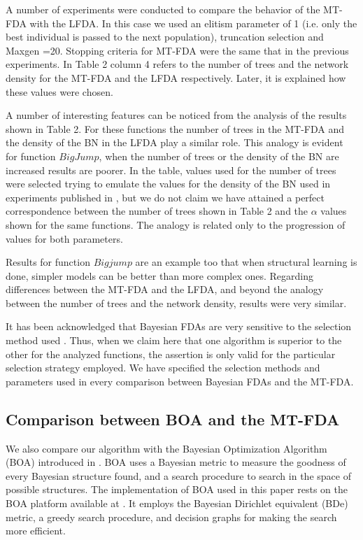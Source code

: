 \documentclass[10pt,thmsa]{article}
\begin{document}
A number of experiments were conducted to compare the behavior of the MT-FDA
with the LFDA. In this case we used an elitism parameter of 1 (i.e. only the
best individual is passed to the next population), truncation selection and
Maxgen =20. Stopping criteria for MT-FDA were the same that in the previous
experiments. In Table 2 column 4 refers to the number of trees and the
network density for the MT-FDA and the LFDA respectively. Later, it is
explained how these values were chosen.

A number of interesting features can be noticed from the analysis of the
results shown in Table 2. For these functions the number of trees in the
MT-FDA and the density of the BN in the LFDA play a similar role. This
analogy is evident for function $BigJump$, when the number of trees or the
density of the BN are increased results are poorer. In the table, values
used for the number of trees were selected trying to emulate the values for
the density of the BN used in experiments published in %
\citep{Muehlenbein_et_Mahnig:2000b}, but we do not claim we have attained a
perfect correspondence between the number of trees shown in Table 2 and the $%
\alpha $ values shown for the same functions. The analogy is related only to
the progression of values for both parameters.

Results for function $Bigjump$ are an example too that when structural
learning is done, simpler models can be better than more complex ones.
Regarding differences between the MT-FDA and the LFDA, and beyond the
analogy between the number of trees and the network density, results were
very similar.

It has been acknowledged that Bayesian FDAs are very sensitive to the
selection method used \citep{Pelikan_et_al:2000d}. Thus, when we claim here
that one algorithm is superior to the other for the analyzed functions, the
assertion is only valid for the particular selection strategy employed. We
have specified the selection methods and parameters used in every comparison
between Bayesian FDAs and the MT-FDA.

\subsection{Comparison between BOA and the MT-FDA}

We also compare our algorithm with the Bayesian Optimization Algorithm (BOA)
introduced in \citep{Pelikan_et_al:1999}. BOA uses a Bayesian metric to
measure the goodness of every Bayesian structure found, and a search
procedure to search in the space of possible structures. The implementation
of BOA used in this paper rests on the BOA platform available at %
\citep{Pelikan_et_al:2000d}. It employs the Bayesian Dirichlet equivalent
(BDe) metric, a greedy search procedure, and decision graphs for making the
search more efficient.
\end{document}
